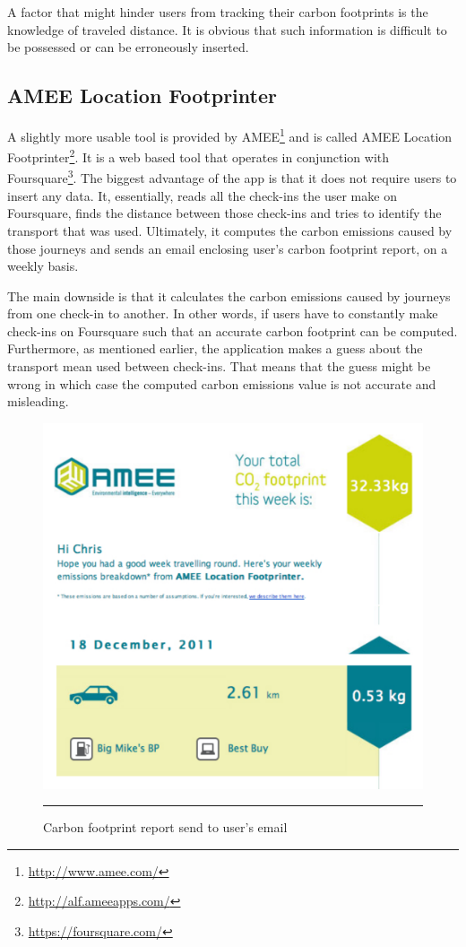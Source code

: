 A factor that might hinder users from tracking their carbon footprints is the knowledge of traveled distance. It is obvious that such information is difficult to be possessed or can be erroneously inserted.

\subsection{AMEE Location Footprinter}

A slightly more usable tool is provided by AMEE\footnote{\url{http://www.amee.com/}} and is called AMEE Location Footprinter\footnote{\url{http://alf.ameeapps.com/}}. It is a web based tool that operates in conjunction with Foursquare\footnote{\url{https://foursquare.com/}}. The biggest advantage of the app is that it does not require users to insert any data. It, essentially, reads all the check-ins the user make on Foursquare, finds the distance between those check-ins and tries to identify the transport that was used. Ultimately, it computes the carbon emissions caused by those journeys and sends an email enclosing user's carbon footprint report, on a weekly basis.

The main downside is that it calculates the carbon emissions caused by journeys from one check-in to another. In other words, if users have to constantly make check-ins on Foursquare such that an accurate carbon footprint can be computed. Furthermore, as mentioned earlier, the application makes a guess about the transport mean used between check-ins. That means that the guess might be wrong in which case the computed carbon emissions value is not accurate and misleading.

\begin{figure}[htbp]
	\centering
		\includegraphics[scale=0.70]{./Figures/chapter2/figure20.pdf}
		\rule{35em}{0.5pt}
	\caption[Carbon footprint report send to user's email]{Carbon footprint report send to user's email}
	\label{fig:ameeLocationFootprinter}
\end{figure}


